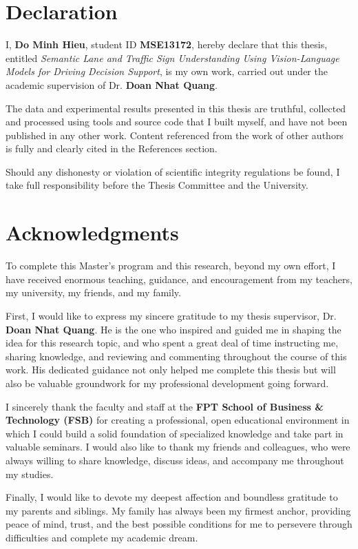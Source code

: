 \documentclass[12pt,a4paper]{report}
\begin{document}
\chapter*{Declaration}
{}
I, \textbf{Do Minh Hieu}, student ID \textbf{MSE13172}, hereby declare that this thesis, entitled \textit{Semantic Lane and Traffic Sign Understanding Using Vision-Language Models for Driving Decision Support}, is my own work, carried out under the academic supervision of Dr. \textbf{Doan Nhat Quang}.

The data and experimental results presented in this thesis are truthful, collected and processed using tools and source code that I built myself, and have not been published in any other work. Content referenced from the work of other authors is fully and clearly cited in the References section.

Should any dishonesty or violation of scientific integrity regulations be found, I take full responsibility before the Thesis Committee and the University.

\chapter*{Acknowledgments}
{}
To complete this Master's program and this research, beyond my own effort, I have received enormous teaching, guidance, and encouragement from my teachers, my university, my friends, and my family.

First, I would like to express my sincere gratitude to my thesis supervisor, Dr. \textbf{Doan Nhat Quang}. He is the one who inspired and guided me in shaping the idea for this research topic, and who spent a great deal of time instructing me, sharing knowledge, and reviewing and commenting throughout the course of this work. His dedicated guidance not only helped me complete this thesis but will also be valuable groundwork for my professional development going forward.

I sincerely thank the faculty and staff at the \textbf{FPT School of Business \& Technology (FSB)} for creating a professional, open educational environment in which I could build a solid foundation of specialized knowledge and take part in valuable seminars. I would also like to thank my friends and colleagues, who were always willing to share knowledge, discuss ideas, and accompany me throughout my studies.

Finally, I would like to devote my deepest affection and boundless gratitude to my parents and siblings. My family has always been my firmest anchor, providing peace of mind, trust, and the best possible conditions for me to persevere through difficulties and complete my academic dream.
\end{document}
